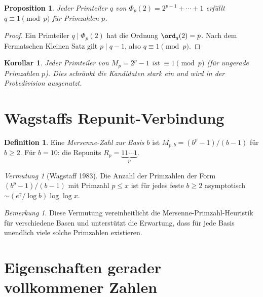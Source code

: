 \documentclass[12pt,a4paper]{amsart}
\newtheorem{proposition}[theorem]{Proposition}
\newtheorem{korollar}[theorem]{Korollar}
\theoremstyle{definition}
\newtheorem{definition_de}[theorem]{Definition}
\theoremstyle{remark}
\newtheorem{bemerkung}[theorem]{Bemerkung}
\newtheorem{vermutung}[theorem]{Vermutung}
\begin{document}
\begin{proposition}
Jeder Primteiler $q$ von $\Phi_p(2) = 2^{p-1} + \cdots + 1$ erfüllt
$q \equiv 1 \pmod{p}$ für Primzahlen $p$.
\end{proposition}

\begin{proof}
Ein Primteiler $q \mid \Phi_p(2)$ hat die Ordnung $\ord_q(2) = p$.
Nach dem Fermatschen Kleinen Satz gilt $p \mid q-1$, also $q \equiv 1 \pmod{p}$.
\end{proof}

\begin{korollar}
Jeder Primteiler von $M_p = 2^p - 1$ ist $\equiv 1 \pmod{p}$
(für ungerade Primzahlen $p$).
Dies schränkt die Kandidaten stark ein und wird in der Probedivision ausgenutzt.
\end{korollar}

\section{Wagstaffs Repunit-Verbindung}

\begin{definition_de}
Eine \emph{Mersenne-Zahl zur Basis $b$} ist $M_{p,b} = (b^p - 1)/(b - 1)$
für $b \geq 2$.
Für $b = 10$: die Repunits $R_p = \underbrace{11\cdots1}_p$.
\end{definition_de}

\begin{vermutung}[Wagstaff 1983]
Die Anzahl der Primzahlen der Form $(b^p - 1)/(b-1)$ mit Primzahl $p \leq x$
ist für jedes feste $b \geq 2$ asymptotisch $\sim (e^\gamma / \log b) \log\log x$.
\end{vermutung}

\begin{bemerkung}
Diese Vermutung vereinheitlicht die Mersenne-Primzahl-Heuristik für verschiedene
Basen und unterstützt die Erwartung, dass für jede Basis unendlich viele solche
Primzahlen existieren.
\end{bemerkung}

\section{Eigenschaften gerader vollkommener Zahlen}
\end{document}
